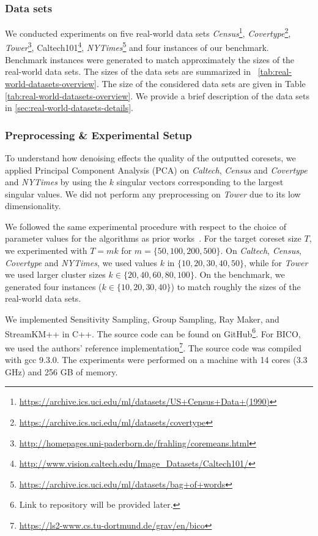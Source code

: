 \subsubsection*{Data sets}
We conducted experiments on five real-world data sets \textit{Census}\footnote{\url{https://archive.ics.uci.edu/ml/datasets/US+Census+Data+(1990)}}, \textit{Covertype}\footnote{\url{https://archive.ics.uci.edu/ml/datasets/covertype}}, \textit{Tower}\footnote{\url{http://homepages.uni-paderborn.de/frahling/coremeans.html}}, Caltech101\footnote{\url{http://www.vision.caltech.edu/Image_Datasets/Caltech101/}}, \textit{NYTimes}\footnote{\url{https://archive.ics.uci.edu/ml/datasets/bag+of+words}} and four instances of our benchmark. Benchmark instances were generated to match approximately the sizes of the real-world data sets. The sizes of the data sets are summarized in ~\cref{tab:real-world-datasets-overview}. 
The size of the considered data sets are given in Table \ref{tab:real-world-datasets-overview}.
We provide a brief description of the data sets in \cref{sec:real-world-datasets-details}.


\subsubsection*{Preprocessing \& Experimental Setup}
To understand how denoising effects the quality of the outputted coresets, we applied Principal Component Analysis (PCA) on \textit{Caltech}, \textit{Census} and \textit{Covertype} and \textit{NYTimes} by using the $k$ singular vectors corresponding to the largest singular values. 
We did not perform any preprocessing on \textit{Tower} due to its low dimensionality.

We followed the same experimental procedure with respect to the choice of parameter values for the algorithms as prior works~\cite{AckermannMRSLS12, FGSSS13}. For the target coreset size $T$, we experimented with $T=mk$ for $m = \{50, 100, 200, 500\}$. On \textit{Caltech}, \textit{Census},  \textit{Covertype} and \textit{NYTimes}, we used values $k$ in $\{10, 20, 30, 40, 50\}$, while for \textit{Tower} we used larger cluster sizes $k \in \{20, 40, 60, 80, 100\}$. On the benchmark, we generated four instances ($k \in \{10, 20, 30, 40\}$) to match roughly the sizes of the real-world data sets.


We implemented Sensitivity Sampling, Group Sampling, Ray Maker, and StreamKM++ in C++. The source code can be found on GitHub\footnote{Link to repository will be provided later.}. For BICO, we used the authors' reference implementation\footnote{\url{https://ls2-www.cs.tu-dortmund.de/grav/en/bico}}. The source code was compiled with gcc 9.3.0. The experiments were performed on a machine with 14 cores (3.3 GHz) and 256 GB of memory.


